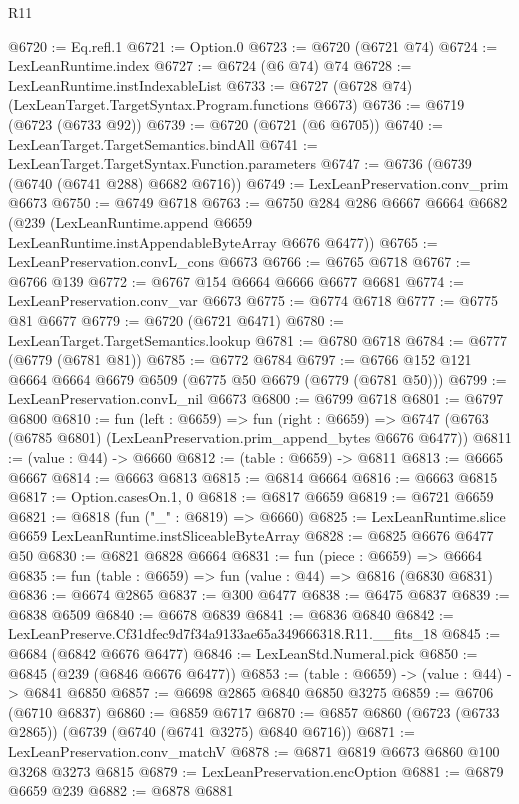 \begin{lexlean}{R11}
\begin{coremodule}
@6720 := Eq.refl.{1}
@6721 := Option.{0}
@6723 := @6720 (@6721 @74)
@6724 := LexLeanRuntime.index
@6727 := @6724 (@6 @74) @74
@6728 := LexLeanRuntime.instIndexableList
@6733 := @6727 (@6728 @74) (LexLeanTarget.TargetSyntax.Program.functions @6673)
@6736 := @6719 (@6723 (@6733 @92))
@6739 := @6720 (@6721 (@6 @6705))
@6740 := LexLeanTarget.TargetSemantics.bindAll
@6741 := LexLeanTarget.TargetSyntax.Function.parameters
@6747 := @6736 (@6739 (@6740 (@6741 @288) @6682 @6716))
@6749 := LexLeanPreservation.conv_prim @6673
@6750 := @6749 @6718
@6763 := @6750
    @284
    @286
    @6667
    @6664
    @6682
    (@239 (LexLeanRuntime.append @6659 LexLeanRuntime.instAppendableByteArray @6676 @6477))
@6765 := LexLeanPreservation.convL_cons @6673
@6766 := @6765 @6718
@6767 := @6766 @139
@6772 := @6767 @154 @6664 @6666 @6677 @6681
@6774 := LexLeanPreservation.conv_var @6673
@6775 := @6774 @6718
@6777 := @6775 @81 @6677
@6779 := @6720 (@6721 @6471)
@6780 := LexLeanTarget.TargetSemantics.lookup
@6781 := @6780 @6718
@6784 := @6777 (@6779 (@6781 @81))
@6785 := @6772 @6784
@6797 := @6766 @152 @121 @6664 @6664 @6679 @6509 (@6775 @50 @6679 (@6779 (@6781 @50)))
@6799 := LexLeanPreservation.convL_nil @6673
@6800 := @6799 @6718
@6801 := @6797 @6800
@6810 := fun (left : @6659) =>
  fun (right : @6659) =>
  @6747 (@6763 (@6785 @6801) (LexLeanPreservation.prim_append_bytes @6676 @6477))
@6811 := (value : @44) -> @6660
@6812 := (table : @6659) -> @6811
@6813 := @6665 @6667
@6814 := @6663 @6813
@6815 := @6814 @6664
@6816 := @6663 @6815
@6817 := Option.casesOn.{1, 0}
@6818 := @6817 @6659
@6819 := @6721 @6659
@6821 := @6818 (fun ("_" : @6819) => @6660)
@6825 := LexLeanRuntime.slice @6659 LexLeanRuntime.instSliceableByteArray
@6828 := @6825 @6676 @6477 @50
@6830 := @6821 @6828 @6664
@6831 := fun (piece : @6659) => @6664
@6835 := fun (table : @6659) => fun (value : @44) => @6816 (@6830 @6831)
@6836 := @6674 @2865
@6837 := @300 @6477
@6838 := @6475 @6837
@6839 := @6838 @6509
@6840 := @6678 @6839
@6841 := @6836 @6840
@6842 := LexLeanPreserve.Cf31dfec9d7f34a9133ae65a349666318.R11.__fits_18
@6845 := @6684 (@6842 @6676 @6477)
@6846 := LexLeanStd.Numeral.pick
@6850 := @6845 (@239 (@6846 @6676 @6477))
@6853 := (table : @6659) -> (value : @44) -> @6841 @6850
@6857 := @6698 @2865 @6840 @6850 @3275
@6859 := @6706 (@6710 @6837)
@6860 := @6859 @6717
@6870 := @6857 @6860 (@6723 (@6733 @2865)) (@6739 (@6740 (@6741 @3275) @6840 @6716))
@6871 := LexLeanPreservation.conv_matchV
@6878 := @6871 @6819 @6673 @6860 @100 @3268 @3273 @6815
@6879 := LexLeanPreservation.encOption
@6881 := @6879 @6659 @239
@6882 := @6878 @6881

\end{coremodule}
\end{lexlean}
